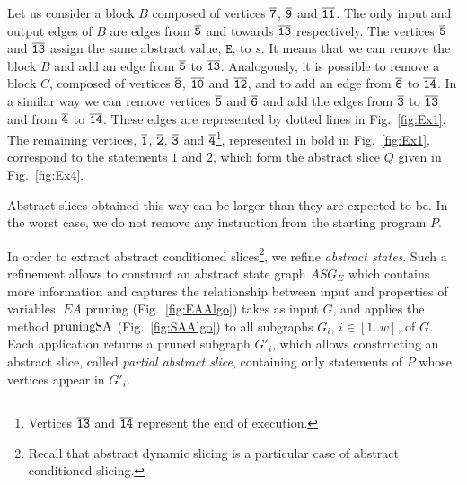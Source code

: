 \documentclass[prodmode,acmtocl]{acmsmall}
\def\prog{\ensuremath{P}\xspace}
\def\progq{\ensuremath{Q}\xspace}
\def\ASG{\ensuremath{\mathit{ASG}}\xspace}
\def\EA{\ensuremath{\mathit{EA}}\xspace}
\newcommand{\0}{\mbox{\bf 0}}
\newcommand{\CODE}[1]{\ensuremath{\mbox{\lstinline!#1!}\xspace}\xspace}
\begin{document}
{\begin{example}
  Let us consider a block $B$ composed of vertices
  $\tt{\overline{7}}$, $\tt{\overline{9}}$ and
  $\tt{\overline{11}}$. The only input and output edges of $B$ are
  edges from $\tt{\overline{5}}$ and towards $\tt{\overline{13}}$
  respectively. The vertices $\tt{\overline{5}}$ and
  $\tt{\overline{13}}$ assign the same abstract value, $\texttt{E}$,
  to $s$. It means that we can remove the block $B$ and add an edge
  from $\tt{\overline{5}}$ to $\tt{\overline{13}}$. Analogously, it is
  possible to remove a block $C$, composed of vertices
  $\tt{\overline{8}}$, $\tt{\overline{10}}$ and $\tt{\overline{12}}$,
  and to add an edge from $\tt{\overline{6}}$ to
  $\tt{\overline{14}}$. In a similar way we can remove vertices
  $\tt{\overline{5}}$ and $\tt{\overline{6}}$ and add the edges from
  $\tt{\overline{3}}$ to $\tt{\overline{13}}$ and from
  $\tt{\overline{4}}$ to $\tt{\overline{14}}$. These edges are
  represented by dotted lines in Fig.~\ref{fig:Ex1}. The remaining
  vertices, $\tt{\overline{1}}$, $\tt{\overline{2}}$,
  $\tt{\overline{3}}$ and $\tt{\overline{4}}$\footnote{Vertices
    $\tt{\overline{13}}$ and $\tt{\overline{14}}$ represent the end of
    execution.}, represented in bold in Fig.~\ref{fig:Ex1}, correspond
  to the statements $1$ and $2$, which form the abstract slice
  $\progq$ given in Fig.~\ref{fig:Ex4}.
\end{example}

Abstract slices obtained this way can be larger than they are expected
to be. In the worst case, we do not remove any instruction from the
starting program $P$.

In order to extract abstract conditioned slices\footnote{Recall that
  abstract dynamic slicing is a particular case of abstract
  conditioned slicing.}, we refine \emph{abstract states}.  Such a
refinement allows to construct an abstract state graph $\ASG_{E}$
which contains more information and captures the relationship between
input and properties of variables.  $\EA$ pruning
(Fig.~\ref{fig:EAAlgo}) takes as input $G$, and applies the method
\CODE{pruningSA} (Fig.~\ref{fig:SAAlgo}) to all subgraphs $G_i$,
$i\!\in\![1..w]$, of $G$.  Each application returns a pruned subgraph
$G'_i$, which allows constructing an abstract slice, called
\emph{partial abstract slice}, containing only statements of $\prog$
whose vertices appear in $G'_i$.

}
\end{document}
